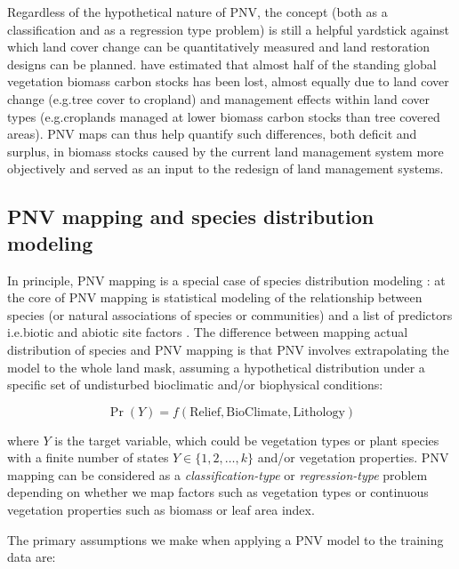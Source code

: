\documentclass[fleqn,10pt,lineno]{wlpeerj} %
\begin{document}
Regardless of the hypothetical nature of PNV, the concept (both as a classification and as a regression type problem) is still a helpful yardstick against which land cover change can be quantitatively measured and land restoration designs can be planned. \citet{erb2017unexpectedly} have estimated that almost half of the standing global vegetation biomass carbon stocks has been lost, almost equally due to land cover change (e.g.\@ tree cover to cropland) and management effects within land cover types (e.g.\@ croplands managed at lower biomass carbon stocks than tree covered areas). PNV maps can thus help quantify such differences, both deficit and surplus, in biomass stocks caused by the current land management system more objectively and served as an input to the redesign of land management systems. \par

\subsection*{PNV mapping and species distribution modeling}

In principle, PNV mapping is a special case of species distribution modeling \citep{elith2009species,OstbyeHemsing2012,hijmans2016species}: at the core of PNV mapping is statistical modeling of the relationship between species (or natural associations of species or communities) and a list of predictors i.e.\@ biotic and abiotic site factors \citep{elith2009species}. The difference between mapping actual distribution of species and PNV mapping is that PNV involves extrapolating the model to the whole land mask, assuming a hypothetical distribution under a specific set of undisturbed bioclimatic and/or biophysical conditions:

\begin{equation}\label{E:general}
\Pr(Y) = f \left( \mathrm{Relief}, \mathrm{BioClimate}, \mathrm{Lithology} \right)
\end{equation}

\noindent where $Y$ is the target variable, which could be vegetation types or plant species with a finite number of states $Y \in \{1,2,\ldots,k\}$ and/or vegetation properties. PNV mapping can be considered as a \emph{classification-type} or \emph{regression-type} problem depending on whether we map factors such as vegetation types or continuous vegetation properties such as biomass or leaf area index. \par 

The primary assumptions we make when applying a PNV model to the training data are:
\end{document}

